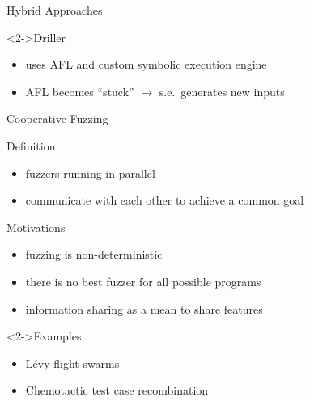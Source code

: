 \documentclass[\HandoutMode,table]{beamer}
\begin{document}
\begin{frame}
    {Hybrid Approaches}
    \vspace{\baselineskip}
    \begin{exampleblock}<2->{Driller}
        \begin{itemize}
            \item{} uses AFL and custom symbolic execution engine
            \item{} AFL becomes ``stuck'' $\rightarrow$ s.e.\ generates new inputs
        \end{itemize}
    \end{exampleblock}
\end{frame}

\begin{frame}
    {Cooperative Fuzzing}
    \begin{block}{Definition}
        \begin{itemize}
            \item{} fuzzers running in parallel
            \item{} communicate with each other to achieve a common goal
        \end{itemize}
    \end{block}
    \begin{block}{Motivations}
        \begin{itemize}
            \item{} fuzzing is non-deterministic
            \item{} there is no best fuzzer for all possible programs
            \item{} information sharing as a mean to share features
        \end{itemize}
    \end{block}
    \begin{exampleblock}<2->{Examples}
        \begin{itemize}
            \item{} L\'evy flight swarms
            \item{} Chemotactic test case recombination
        \end{itemize}
    \end{exampleblock}
\end{frame}
\end{document}
